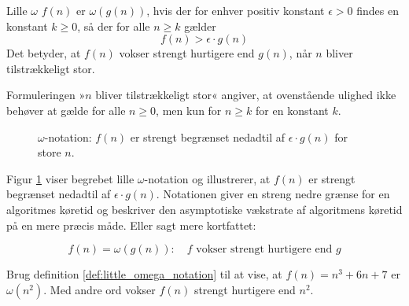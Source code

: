 \begin{definition}{Lille $\omega$}\label{def:little_omega_notation}
    $f(n)$ er $\omega(g(n))$, hvis der for enhver positiv konstant $\epsilon > 0$ findes en konstant $k \geq 0$, så der for alle $n \geq k$ gælder
    \medskip
    \[
    f(n) > \epsilon \cdot g(n)
    \]
    \medskip
    Det betyder, at $f(n)$ vokser strengt hurtigere end $g(n)$, når $n$ bliver tilstrækkeligt stor.
\end{definition}

Formuleringen »$n$ bliver tilstrækkeligt stor« angiver, at ovenstående ulighed ikke behøver at gælde for alle $n \geq 0$, men kun for $n \geq k$ for en konstant $k$.

\begin{figure}[htbp]
    \centering
    \caption{$\omega$-notation: $f(n)$ er strengt begrænset nedadtil af $\epsilon \cdot g(n)$ for store $n$.}
    \label{fig:little_omega_notation}
\end{figure}

Figur \ref{fig:little_omega_notation} viser begrebet lille $\omega$-notation og illustrerer, at $f(n)$ er strengt begrænset nedadtil af $\epsilon \cdot g(n)$. Notationen giver en streng nedre grænse for en algoritmes køretid og beskriver den asymptotiske vækstrate af algoritmens køretid på en mere præcis måde. Eller sagt mere kortfattet:

\[
f(n)=\omega(g(n)): \quad f \text{ vokser strengt hurtigere end } g
\]

\begin{example}
    Brug definition \ref{def:little_omega_notation} til at vise, at $f(n)=n^3 + 6n + 7$ er $\omega(n^2)$. Med andre ord vokser $f(n)$ strengt hurtigere end $n^2$.
\end{example}

